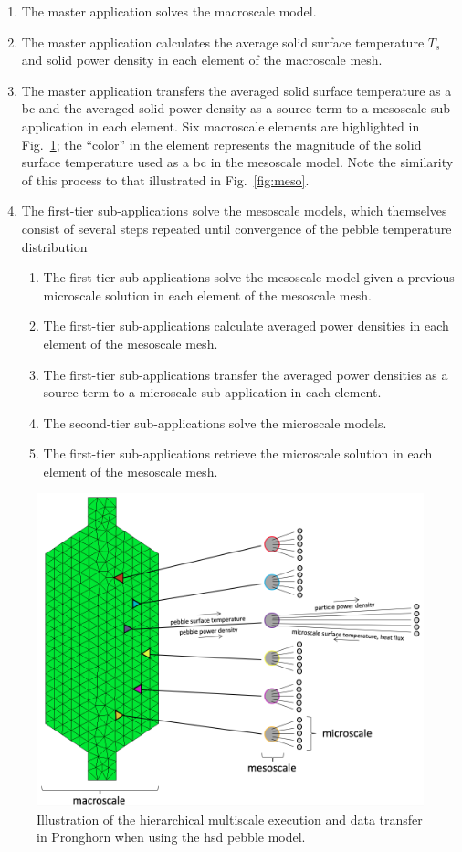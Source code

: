 \begin{enumerate}
\itemsep0.3em
\item The master application solves the macroscale model.
\item The master application calculates the average solid surface temperature \(T_s\) and solid power density in each element of the macroscale mesh.
\item The master application transfers the averaged solid surface temperature as a \gls{bc} and the averaged solid power density as a source term to a mesoscale sub-application in each element. Six macroscale elements are highlighted in Fig.\ \ref{fig:multiscale_pbr}; the ``color'' in the element represents the magnitude of the solid surface temperature used as a \gls{bc} in the mesoscale model. Note the similarity of this process to that illustrated in Fig.\ \ref{fig:meso}.
\item The first-tier sub-applications solve the mesoscale models, which themselves consist of several steps repeated until convergence of the pebble temperature distribution\mdash
	\begin{enumerate}
  \itemsep0.3em
	\item The first-tier sub-applications solve the mesoscale model given a previous microscale solution in each element of the mesoscale mesh.
	\item The first-tier sub-applications calculate averaged power densities in each element of the mesoscale mesh.
	\item The first-tier sub-applications transfer the averaged power densities as a source term to a microscale sub-application in each element.
	\item The second-tier sub-applications solve the microscale models.
	\item The first-tier sub-applications retrieve the microscale solution in each element of the mesoscale mesh.
	\end{enumerate}
\end{enumerate}

\begin{figure}[!h]
\centering
\includegraphics[width=0.8\linewidth]{figs/multiscale_pbr_d.png}
\caption{Illustration of the hierarchical multiscale execution and data transfer in Pronghorn when using the \gls{hsd} pebble model.}
\label{fig:multiscale_pbr}
\end{figure}

